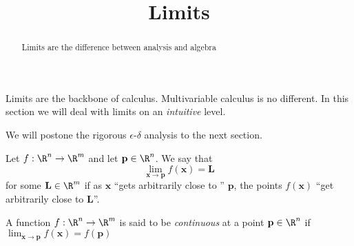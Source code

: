 \documentclass{ximera}
\title{Limits}
\begin{document}
\begin{abstract}
	Limits are the difference between analysis and algebra
\end{abstract}


Limits are the backbone of calculus.  Multivariable calculus is no different.  In this section we will deal with limits on an \textit{intuitive} level.

We will postone the rigorous $\epsilon$-$\delta$ analysis to the next section.
\begin{definition}
Let $f: \R^n \to \R^m$ and let $\mathbf{p} \in \R^n$.  We say that \[\displaystyle\lim_{\mathbf{x} \to \mathbf{p}} f(\mathbf{x}) = \mathbf{L}\] for some $\mathbf{L} \in \R^m$ 
if as $\mathbf{x}$ ``gets arbitrarily close to '' $\mathbf{p}$, the points $f(\mathbf{x})$ ``get arbitrarily close to $\mathbf{L}$''.  
	\end{definition}
	
	
	
	\begin{definition}
		A function $f: \R^n \to \R^m$ is said to be \textit{continuous} at a point $\mathbf{p} \in \R^n$ if \(\displaystyle\lim_{\mathbf{x} \to \mathbf{p}} f(\mathbf{x}) = f(\mathbf{p})\)
	\end{definition}
	
\end{document}
